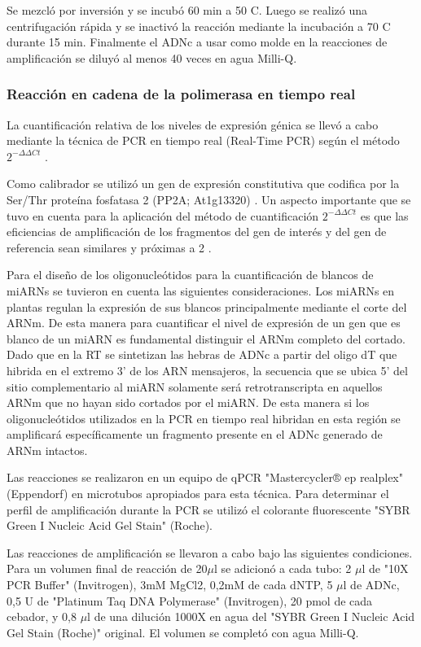 Se mezcló por inversión y se incubó 60 min a 50 \degree C. Luego se realizó una centrifugación rápida y se inactivó la reacción mediante la incubación a 70 \degree C durante 15 min.
Finalmente el ADNc a usar como molde en la reacciones de amplificación se diluyó al menos 40 veces en agua Milli-Q.

\subsubsection{Reacción en cadena de la polimerasa en tiempo real}
La cuantificación relativa de los niveles de expresión génica se llevó a cabo mediante la técnica de PCR en tiempo real (Real-Time PCR) según el método $2^{-\Delta \Delta Ct}$ \citep{pmid11328886}.

Como calibrador se utilizó un gen de expresión constitutiva que codifica por la Ser/Thr proteína fosfatasa 2 (PP2A; At1g13320) \citep{pmid16166256}.
Un aspecto importante que se tuvo en cuenta para la aplicación del método de cuantificación $2^{- \Delta \Delta Ct}$ es que las eficiencias de amplificación de los fragmentos del gen de interés y del gen de referencia sean similares y próximas a 2 \citep{pmid11328886}.

Para el diseño de los oligonucleótidos para la cuantificación de blancos de miARNs se tuvieron en cuenta las siguientes consideraciones. 
Los miARNs en plantas regulan la expresión de sus blancos principalmente mediante el corte del ARNm. 
De esta manera para cuantificar el nivel de expresión de un gen que es blanco de un miARN es fundamental distinguir el ARNm completo del cortado.
Dado que en la RT se sintetizan las hebras de ADNc a partir del oligo dT que hibrida en el extremo 3' de los ARN mensajeros, la secuencia que se ubica 5' del sitio complementario al miARN solamente será retrotranscripta en aquellos ARNm que no hayan sido cortados por el miARN. 
De esta manera si los oligonucleótidos utilizados en la PCR en tiempo real hibridan en esta región se amplificará específicamente un fragmento presente en el ADNc generado de ARNm intactos.

Las reacciones se realizaron en un equipo de qPCR "Mastercycler® ep realplex" (Eppendorf) en microtubos apropiados para esta técnica. 
Para determinar el perfil de amplificación durante la PCR se utilizó el colorante fluorescente "SYBR Green I Nucleic Acid Gel Stain" (Roche).

Las reacciones de amplificación se llevaron a cabo bajo las siguientes condiciones.
Para un volumen final de reacción de 20$\mu$l se adicionó a cada tubo: 2 $\mu$l de "10X PCR Buffer" (Invitrogen), 3mM MgCl2, 0,2mM de cada dNTP, 5 $\mu$l de ADNc, 0,5 U de "Platinum Taq DNA Polymerase" (Invitrogen), 20 pmol de cada cebador, y 0,8 $\mu$l de una dilución 1000X en agua del "SYBR Green I Nucleic Acid Gel Stain (Roche)" original.
El volumen se completó con agua Milli-Q.

